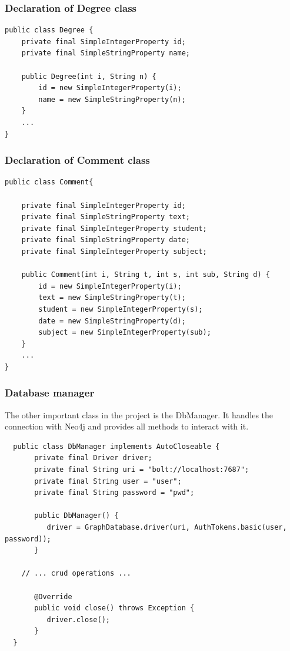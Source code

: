 \documentclass[a4paper]{article}
\begin{document}
\subsubsection{Declaration of Degree class}
\begin{verbatim}
public class Degree {
    private final SimpleIntegerProperty id;
    private final SimpleStringProperty name;
    
    public Degree(int i, String n) {
        id = new SimpleIntegerProperty(i);
        name = new SimpleStringProperty(n);
    }
    ...
}
\end{verbatim}

\subsubsection{Declaration of Comment class}
\begin{verbatim}
public class Comment{

    private final SimpleIntegerProperty id;
    private final SimpleStringProperty text;
    private final SimpleIntegerProperty student;
    private final SimpleStringProperty date;
    private final SimpleIntegerProperty subject;

    public Comment(int i, String t, int s, int sub, String d) {
        id = new SimpleIntegerProperty(i);
        text = new SimpleStringProperty(t);
        student = new SimpleIntegerProperty(s);
        date = new SimpleStringProperty(d);
        subject = new SimpleIntegerProperty(sub);
    }
	...
}
\end{verbatim}

\subsubsection{Database manager}
The other important class in the project is the DbManager. It handles the connection with Neo4j and provides all methods to interact with it.

\begin{verbatim}
  public class DbManager implements AutoCloseable {
       private final Driver driver;
       private final String uri = "bolt://localhost:7687";
       private final String user = "user";
       private final String password = "pwd";

       public DbManager() {
          driver = GraphDatabase.driver(uri, AuthTokens.basic(user, password));
       }

    // ... crud operations ...

       @Override
       public void close() throws Exception {
          driver.close();
       }
  }
\end{verbatim}
\end{document}
